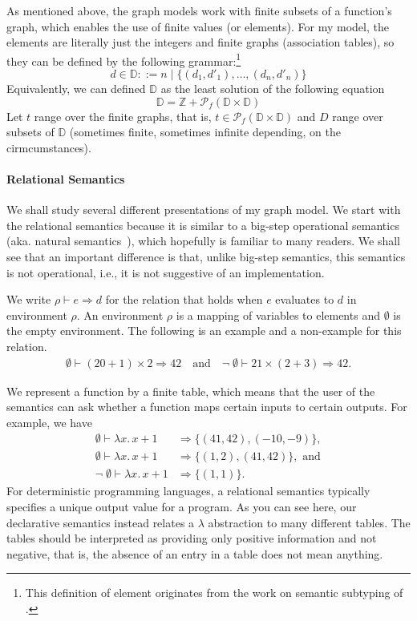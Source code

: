 \documentclass{tufte-handout}
\newcommand{\LAM}[1]{\lambda #1.\,}
\begin{document}
As mentioned above, the graph models work with finite subsets of a
function's graph, which enables the use of finite values (or
elements). For my model, the elements are literally just the integers
and finite graphs (association tables), so they can be defined by the
following grammar:\footnote{This definition of element originates from
  the work on semantic subtyping of \citet{Frisch:2008aa}.}
\[
   d \in \mathbb{D} ::= n \mid \{ (d_1,d'_1), \ldots, (d_n,d'_n) \}
\]
Equivalently, we can defined $\mathbb{D}$ as the least solution of the
following equation
\[
   \mathbb{D} = \mathbb{Z} + \mathcal{P}_f(\mathbb{D} \times \mathbb{D})
\]
Let $t$ range over the finite graphs, that is, $t \in
\mathcal{P}_f(\mathbb{D} \times \mathbb{D})$ and $D$ range over
subsets of $\mathbb{D}$ (sometimes finite, sometimes infinite
depending, on the cirmcumstances).


\paragraph{Relational Semantics}

We shall study several different presentations of my graph model.  We
start with the relational semantics because it is similar to a
big-step operational semantics (aka. natural
semantics~\citep{Kahn:1987aa}), which hopefully is familiar to many
readers. We shall see that an important difference is that, unlike
big-step semantics, this semantics is not operational, i.e., it is not
suggestive of an implementation.

We write $\rho \vdash e \Rightarrow d$ for the relation that holds
when $e$ evaluates to $d$ in environment $\rho$. An environment $\rho$
is a mapping of variables to elements and $\emptyset$ is the empty
environment. The following is an example and a non-example for this
relation.
\begin{align*}
   \emptyset \vdash (20 + 1) \times 2 \Rightarrow 42 \quad\text{and}\quad
   \neg\; \emptyset \vdash 21 \times (2 + 3) \Rightarrow 42.
\end{align*}

We represent a function by a finite table, which means that the user
of the semantics can ask whether a function maps certain inputs to
certain outputs. For example, we have
\begin{align*}
  \emptyset\vdash \LAM{x} x+1 &\Rightarrow 
    \{ (41,42), (-10,-9) \}, \\
  \emptyset\vdash \LAM{x} x+1 &\Rightarrow  
    \{ (1,2), (41,42) \}, \text{ and}\\
  \neg\; \emptyset\vdash \LAM{x} x+1 &\Rightarrow \{ (1,1) \}.
\end{align*}
For deterministic programming languages, a relational semantics
typically specifies a unique output value for a program. As you can
see here, our declarative semantics instead relates a $\lambda$
abstraction to many different tables. The tables should be interpreted
as providing only positive information and not negative, that is, the
absence of an entry in a table does not mean anything.
\end{document}
